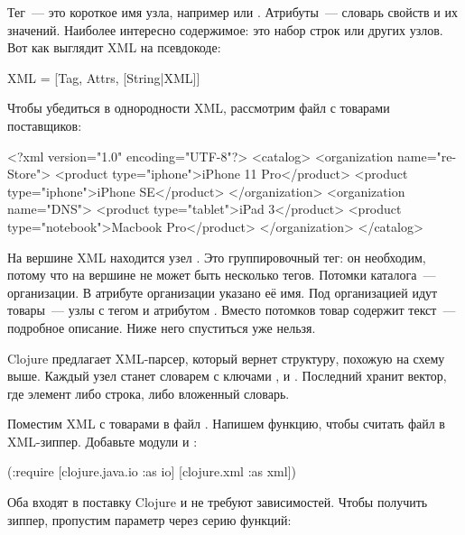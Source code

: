 Тег~--- это короткое имя узла, например  или . Атрибуты~---
словарь свойств и их значений. Наиболее интересно содержимое: это набор строк
или других узлов. Вот как выглядит XML на псевдокоде:

\begin{english}
  \begin{text}
XML = [Tag, Attrs, [String|XML]]
  \end{text}
\end{english}

Чтобы убедиться в однородности XML, рассмотрим файл с товарами поставщиков:

\begin{english}
  \begin{xml}
<?xml version="1.0" encoding="UTF-8"?>
<catalog>
  <organization name="re-Store">
    <product type="iphone">iPhone 11 Pro</product>
    <product type="iphone">iPhone SE</product>
  </organization>
  <organization name="DNS">
    <product type="tablet">iPad 3</product>
    <product type="notebook">Macbook Pro</product>
  </organization>
</catalog>
  \end{xml}
\end{english}

На вершине XML находится узел . Это группировочный тег: он необходим,
потому что на вершине не может быть несколько тегов. Потомки каталога~---
организации. В атрибуте  организации указано её имя. Под организацией идут
товары~--- узлы с тегом  и атрибутом . Вместо потомков товар
содержит текст~--- подробное описание. Ниже него спуститься уже нельзя.

Clojure предлагает XML-парсер, который вернет структуру, похожую на схему
 выше. Каждый узел станет словарем с ключами
,  и . Последний хранит вектор, где
элемент либо строка, либо вложенный словарь.

Поместим XML с товарами в файл . Напишем функцию, чтобы
считать файл в XML-зиппер. Добавьте модули  и :

\begin{english}
  \begin{clojure}
(:require
 [clojure.java.io :as io]
 [clojure.xml :as xml])
  \end{clojure}
\end{english}

Оба входят в поставку Clojure и не требуют зависимостей. Чтобы получить зиппер,
пропустим параметр  через серию функций:

